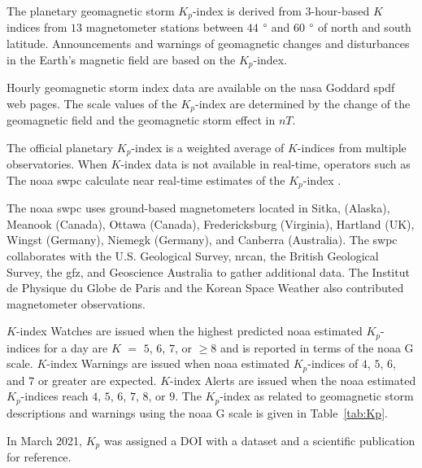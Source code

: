 \documentclass[sn-mathphys-num]{sn-jnl}%
\begin{document}
The planetary geomagnetic storm $K_{p}$-index \cite{Matzka2024} is derived from $3$-hour-based $K$ indices from $13$ magnetometer stations between $44$ $\degree$ and $60$ $\degree$ of north and south latitude. Announcements and warnings \cite{NOAA2024cAlertsWatches} of geomagnetic changes and disturbances in the Earth's magnetic field are based on the $K_{p}$-index.

Hourly geomagnetic storm index data are available on the \acrshort{nasa} Goddard \acrshort{spdf} \cite{Papitashvili2024About, Papitashvili2024Explorer} web pages. The scale values of the $K_{p}$-index are determined by the change of the geomagnetic field and the geomagnetic storm effect in $nT$.

The official planetary $K_{p}$-index is a weighted average of $K$-indices from multiple observatories. When $K$-index data is not available in real-time, operators such as The \acrfull{noaa} \acrfull{swpc} calculate near real-time estimates of the $K_{p}$-index \cite{Myint2022}.

The \acrshort{noaa} \acrshort{swpc} \cite{NOAA2024dPlanetaryKindex} uses ground-based magnetometers located in Sitka, (Alaska), Meanook (Canada), Ottawa (Canada), Fredericksburg (Virginia), Hartland (UK), Wingst (Germany), Niemegk (Germany), and Canberra (Australia). The \acrshort{swpc} collaborates with the U.S. Geological Survey, \acrfull{nrcan}, the British Geological Survey, the \acrfull{gfz}, and Geoscience Australia to gather additional data. The Institut de Physique du Globe de Paris and the Korean Space Weather also contributed magnetometer observations. 

$K$-index Watches are issued when the highest predicted \acrshort{noaa} estimated $K_{p}$-indices for a day are $K$ $=$ $5$, $6$, $7$, or $\geq 8$ and is reported in terms of the \acrshort{noaa} G scale. $K$-index Warnings are issued when \acrshort{noaa} estimated $K_{p}$-indices of $4$, $5$, $6$, and $7$ or greater are expected. $K$-index Alerts are issued when the \acrshort{noaa} estimated $K_{p}$-indices reach $4$, $5$, $6$, $7$, $8$, or $9$. The $K_{p}$-index as related to geomagnetic storm descriptions and warnings using the \acrshort{noaa} G scale \cite{NOAA2024eSpace, NOAA2024fScales} is given in Table~\ref{tab:Kp}.

In March 2021, $K_{p}$ was assigned a DOI with a dataset \cite{Matzka2021a} and a scientific publication \cite{Matzka2021b} for reference.
\end{document}
